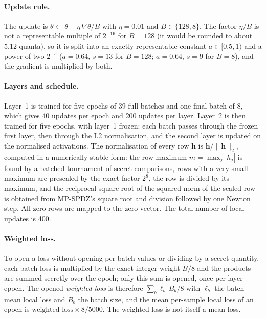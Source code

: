 \paragraph{Update rule.} The update is $\theta\leftarrow\theta-\eta\,\nabla\theta/B$ with $\eta=0.01$ and $B\in\{128,8\}$. The factor $\eta/B$ is not a representable multiple of $2^{-16}$ for $B=128$ (it would be rounded to about $5.12$ quanta), so it is split into an exactly representable constant $a\in[0.5,1)$ and a power of two $2^{-s}$ ($a=0.64$, $s=13$ for $B=128$; $a=0.64$, $s=9$ for $B=8$), and the gradient is multiplied by both.

\paragraph{Layers and schedule.} Layer~1 is trained for five epochs of 39 full batches and one final batch of 8, which gives 40 updates per epoch and 200 updates per layer. Layer~2 is then trained for five epochs, with layer~1 frozen: each batch passes through the frozen first layer, then through the L2 normalisation, and the second layer is updated on the normalised activations. The normalisation of every row $\mathbf{h}$ is $\mathbf{h}/\lVert\mathbf{h}\rVert_2$, computed in a numerically stable form: the row maximum $m=\max_j|h_j|$ is found by a batched tournament of secret comparisons, rows with a very small maximum are prescaled by the exact factor $2^{8}$, the row is divided by its maximum, and the reciprocal square root of the squared norm of the scaled row is obtained from MP-SPDZ's square root and division followed by one Newton step. All-zero rows are mapped to the zero vector. The total number of local updates is 400.

\paragraph{Weighted loss.} To open a loss without opening per-batch values or dividing by a secret quantity, each batch loss is multiplied by the exact integer weight $B/8$ and the products are summed secretly over the epoch; only this sum is opened, once per layer-epoch. The opened \emph{weighted loss} is therefore $\sum_b \ell_b\,B_b/8$ with $\ell_b$ the batch-mean local loss and $B_b$ the batch size, and the mean per-sample local loss of an epoch is $\text{weighted loss}\times8/5000$. The weighted loss is not itself a mean loss.

